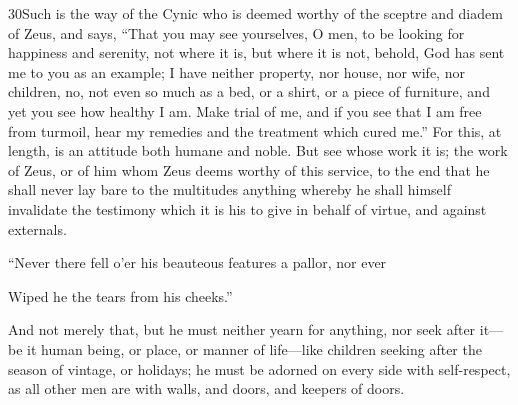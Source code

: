 30Such is the way of the Cynic who is deemed worthy of the sceptre and diadem of Zeus, and says, ``That you may see yourselves, O men, to be looking for happiness and serenity, not where it is, but where it is not, behold, God has sent me to you as an example; I have neither property, nor house, nor wife, nor children, no, not even so much as a bed, or a shirt, or a piece of furniture, and yet you see how healthy I am. Make trial of me, and if you see that I am free from turmoil, hear my remedies and the treatment which cured me.'' For this, at length, is an attitude both humane and noble. But see whose work it is; the work of Zeus, or of him whom Zeus deems worthy of this service, to the end that he shall never lay bare to the multitudes anything whereby he shall himself invalidate the testimony which it is his to give in behalf of virtue, and against externals.

``Never there fell o'er his beauteous features a pallor, nor ever

Wiped he the tears from his cheeks.''

And not merely that, but he must neither yearn for anything, nor seek after it—be it human being, or place, or manner of life—like children seeking after the season of vintage, or holidays; he must be adorned on every side with self-respect, as all other men are with walls, and doors, and keepers of doors.


